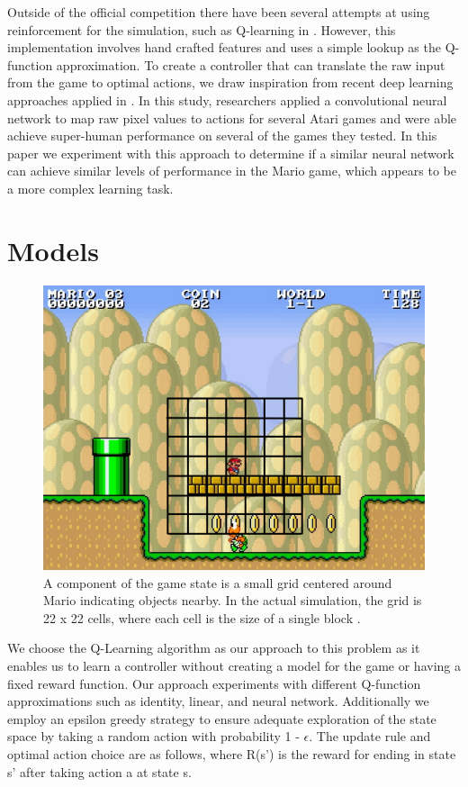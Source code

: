 \documentclass[12pt]{article}
\begin{document}
Outside of the official competition there have been several attempts at using reinforcement for the simulation, such as Q-learning in \cite{liao2012cs229}. However, this implementation involves hand crafted features and uses a simple lookup as the Q-function approximation. To create a controller that can translate the raw input from the game to optimal actions, we draw inspiration from recent deep learning approaches applied in \cite{mnih2013playing}. In this study, researchers applied a convolutional neural network to map raw pixel values to actions for several Atari games and were able achieve super-human performance on several of the games they tested. In this paper we experiment with this approach to determine if a similar neural network can achieve similar levels of performance in the Mario game, which appears to be a more complex learning task.

\section{Models}

\begin{figure}[h]
\centering
\includegraphics[scale=0.5]{imgs/mario_grid}
\caption{A component of the game state is a small grid centered around Mario indicating objects nearby. In the actual simulation, the grid is 22 x 22 cells, where each cell is the size of a single block \cite{karakovskiy2012mario}.}
\label{mario_grid}
\end{figure}

We choose the Q-Learning algorithm as our approach to this problem as it enables us to learn a controller without creating a model for the game or having a fixed reward function. Our approach experiments with different Q-function approximations such as identity, linear, and neural network. Additionally we employ an epsilon greedy strategy to ensure adequate exploration of the state space by taking a random action with probability 1 - $\epsilon$. The update rule and optimal action choice are as follows, where R(s') is the reward for ending in state s' after taking action a at state s.
\end{document}
